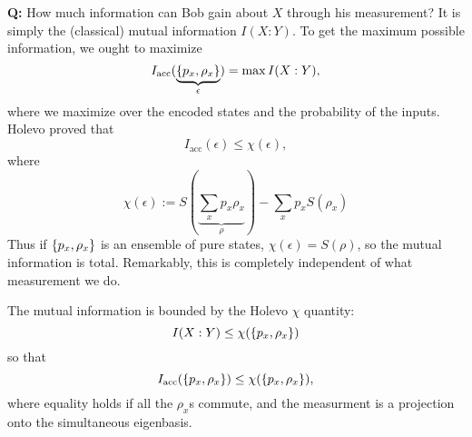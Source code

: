 \textbf{Q:} How much information can Bob gain about $X$ through his measurement? It is simply the (classical) mutual information $I(X:Y)$. To get the maximum possible information, we ought to maximize
\begin{equation}
    I_\text{acc}(\underbrace{\{p_x,\rho_x\}}_\epsilon) = \max I(X:Y),
\end{equation}
where we maximize over the encoded states and the probability of the inputs. Holevo proved that
\begin{equation}
    I_\text{acc}(\epsilon) \leq \chi(\epsilon),
\end{equation}
where
\begin{equation}
    \chi(\epsilon):= S(\underbrace{\sum_x p_x \rho_x}_\rho) - \sum_x p_x S(\rho_x)
\end{equation}
Thus if $\{p_x,\rho_x\}$ is an ensemble of pure states, $\chi(\epsilon)=S(\rho)$, so the mutual information is total. Remarkably, this is completely independent of what measurement we do.
\begin{thm}
    The mutual information is bounded by the Holevo $\chi$ quantity:
    \begin{equation}
        I(X:Y)\leq \chi(\{p_x,\rho_x\})
    \end{equation}
    so that
    \begin{equation}
        I_\text{acc}(\{p_x,\rho_x\})\leq \chi(\{p_x,\rho_x\}),
    \end{equation}
    where equality holds if all the $\rho_x$s commute, and the measurment is a projection onto the simultaneous eigenbasis.
\end{thm}
